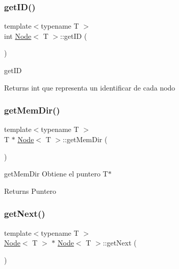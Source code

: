 \subsubsection{\texorpdfstring{get\+I\+D()}{getID()}}
{\footnotesize\ttfamily template$<$typename T $>$ \\
int \hyperlink{class_node}{Node}$<$ T $>$\+::get\+ID (\begin{DoxyParamCaption}{ }\end{DoxyParamCaption})}



get\+ID 

\begin{DoxyReturn}{Returns}
int que representa un identificar de cada nodo 
\end{DoxyReturn}
\mbox{\label{class_node_a97539dd60d75f178a43114db930b3a88}} 
\subsubsection{\texorpdfstring{get\+Mem\+Dir()}{getMemDir()}}
{\footnotesize\ttfamily template$<$typename T $>$ \\
T $\ast$ \hyperlink{class_node}{Node}$<$ T $>$\+::get\+Mem\+Dir (\begin{DoxyParamCaption}{ }\end{DoxyParamCaption})}



get\+Mem\+Dir Obtiene el puntero T$\ast$ 

\begin{DoxyReturn}{Returns}
Puntero 
\end{DoxyReturn}
\mbox{\label{class_node_a688501032615bbd05c9f42ef89d63db5}} 
\subsubsection{\texorpdfstring{get\+Next()}{getNext()}}
{\footnotesize\ttfamily template$<$typename T $>$ \\
\hyperlink{class_node}{Node}$<$ T $>$ $\ast$ \hyperlink{class_node}{Node}$<$ T $>$\+::get\+Next (\begin{DoxyParamCaption}{ }\end{DoxyParamCaption})}



